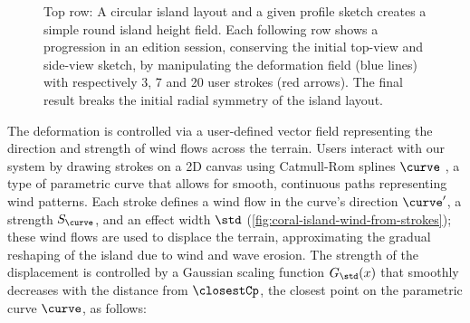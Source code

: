 \begin{figure} 
    \caption[Island deformation through strokes]{Top row: A circular island layout and a given profile sketch creates a simple round island height field. Each following row shows a progression in an edition session, conserving the initial top-view and side-view sketch, by manipulating the deformation field (blue lines) with respectively 3, 7 and 20 user strokes (red arrows). The final result breaks the initial radial symmetry of the island layout. }
    \label{fig:coral-island-wind-stroke-edition}
\end{figure}

The deformation is controlled via a user-defined vector field representing the direction and strength of wind flows across the terrain. Users interact with our system by drawing strokes on a 2D canvas using Catmull-Rom splines $\curve$ \cite{Catmull1974}, a type of parametric curve that allows for smooth, continuous paths representing wind patterns. Each stroke defines a wind flow in the curve's direction $\curve'$, a strength $S_\curve$, and an effect width $\std$ (\cref{fig:coral-island-wind-from-strokes}); these wind flows are used to displace the terrain, approximating the gradual reshaping of the island due to wind and wave erosion. The strength of the displacement is controlled by a Gaussian scaling function $G_\std(x)$ that smoothly decreases with the distance from $\closestCp$, the closest point on the parametric curve $\curve$, as follows:

